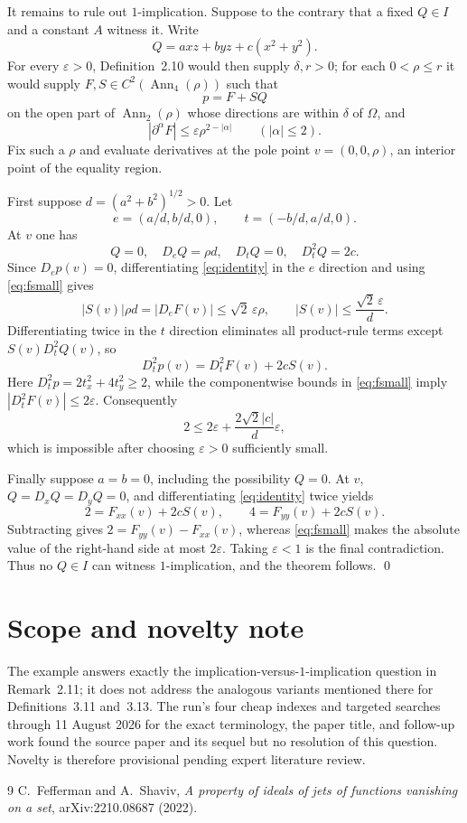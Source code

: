 \documentclass[11pt,a4paper]{article}
\begin{document}
It remains to rule out $1$-implication.  Suppose to the contrary that a fixed
$Q\in I$ and a constant $A$ witness it.  Write
\begin{equation}\label{eq:q}
 Q=axz+byz+c(x^2+y^2).
\end{equation}
For every $\varepsilon>0$, Definition~2.10 would then supply $\delta,r>0$;
for each $0<\rho\le r$ it would supply $F,S\in C^2(\operatorname{Ann}_4(\rho))$
such that
\begin{equation}\label{eq:identity}
 p=F+SQ
\end{equation}
on the open part of $\operatorname{Ann}_2(\rho)$ whose directions are within
$\delta$ of $\Omega$, and
\begin{equation}\label{eq:fsmall}
 |\partial^\alpha F|\le\varepsilon\rho^{2-|\alpha|}
 \qquad(|\alpha|\le2).
\end{equation}
Fix such a $\rho$ and evaluate derivatives at the pole point
$v=(0,0,\rho)$, an interior point of the equality region.

First suppose $d=(a^2+b^2)^{1/2}>0$.  Let
\[
 e=(a/d,b/d,0),\qquad t=(-b/d,a/d,0).
\]
At $v$ one has
\[
 Q=0,\quad D_eQ=\rho d,\quad D_tQ=0,\quad D_t^2Q=2c.
\]
Since $D_ep(v)=0$, differentiating \eqref{eq:identity} in the $e$ direction
and using \eqref{eq:fsmall} gives
\begin{equation}\label{eq:sbound}
 |S(v)|\rho d=|D_eF(v)|\le\sqrt2\,\varepsilon\rho,
 \qquad |S(v)|\le\frac{\sqrt2\,\varepsilon}{d}.
\end{equation}
Differentiating twice in the $t$ direction eliminates all product-rule terms
except $S(v)D_t^2Q(v)$, so
\[
 D_t^2p(v)=D_t^2F(v)+2cS(v).
\]
Here $D_t^2p=2t_x^2+4t_y^2\ge2$, while the componentwise bounds in
\eqref{eq:fsmall} imply $|D_t^2F(v)|\le2\varepsilon$.  Consequently
\[
 2\le 2\varepsilon+\frac{2\sqrt2|c|}{d}\varepsilon,
\]
which is impossible after choosing $\varepsilon>0$ sufficiently small.

Finally suppose $a=b=0$, including the possibility $Q=0$.  At $v$,
$Q=D_xQ=D_yQ=0$, and differentiating \eqref{eq:identity} twice yields
\[
 2=F_{xx}(v)+2cS(v),\qquad
 4=F_{yy}(v)+2cS(v).
\]
Subtracting gives
$2=F_{yy}(v)-F_{xx}(v)$, whereas \eqref{eq:fsmall} makes the absolute value
of the right-hand side at most $2\varepsilon$.  Taking
$\varepsilon<1$ is the final contradiction.  Thus no $Q\in I$ can witness
$1$-implication, and the theorem follows. \qed

\section*{Scope and novelty note}
The example answers exactly the implication-versus-$1$-implication question
in Remark~2.11; it does not address the analogous variants mentioned there
for Definitions~3.11 and~3.13.  The run's four cheap indexes and targeted
searches through 11 August 2026 for the exact terminology, the paper title,
and follow-up work found the source paper and its sequel but no resolution of
this question.  Novelty is therefore provisional pending expert literature
review.

\begin{thebibliography}{9}
C.~Fefferman and A.~Shaviv,
\emph{A property of ideals of jets of functions vanishing on a set},
arXiv:2210.08687 (2022).
\end{thebibliography}
\end{document}

